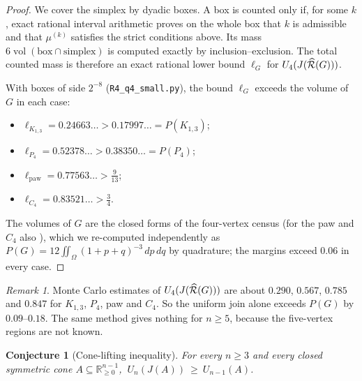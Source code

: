 \documentclass[11pt]{amsart}
\newtheorem{conjecture}[theorem]{Conjecture}
\theoremstyle{definition}
\theoremstyle{remark}
\newtheorem{remark}[theorem]{Remark}
\providecommand{\R}{\mathbb R}
\begin{document}
\begin{proof}
We cover the simplex by dyadic boxes.  A box is counted only if, for some
$k$, exact rational interval arithmetic proves on the whole box that $k$
is admissible and that $\mu^{(k)}$ satisfies the strict conditions above.
Its mass $6\operatorname{vol}(\text{box}\cap\text{simplex})$ is computed
exactly by inclusion--exclusion.  The total counted mass is therefore an
exact rational lower bound $\ell_G$ for $U_4(J(\widehat{\mathcal{R}}(G)))$.

With boxes of side $2^{-8}$ (\texttt{R4\_\allowbreak{}q4\_\allowbreak{}small.py}), the bound $\ell_G$
exceeds the volume of $G$ in each case:
\begin{itemize}
\item $\ell_{K_{1,3}}=0.24663\ldots>0.17997\ldots=P(K_{1,3})$;
\item $\ell_{P_4}=0.52378\ldots>0.38350\ldots=P(P_4)$;
\item $\ell_{\mathrm{paw}}=0.77563\ldots>\frac9{13}$;
\item $\ell_{C_4}=0.83521\ldots>\frac34$.
\end{itemize}
The volumes of $G$ are the closed forms of the four-vertex census
\cite{K-015} (for the paw and $C_4$ also \cite{R4-EJT}), which we
re-computed independently as $P(G)=12\iint_\Omega(1+p+q)^{-3}\,dp\,dq$ by
quadrature; the margins exceed $0.06$ in every case.
\end{proof}

\begin{remark}
Monte Carlo estimates of $U_4(J(\widehat{\mathcal{R}}(G)))$ are about $0.290$, $0.567$,
$0.785$ and $0.847$ for $K_{1,3}$, $P_4$, paw and $C_4$.  So the uniform
join alone exceeds $P(G)$ by $0.09$--$0.18$.  The same method gives
nothing for $n\ge5$, because the five-vertex regions are not known.
\end{remark}

\begin{conjecture}[Cone-lifting inequality]\label{R4:conj:cone}
For every $n\ge3$ and every closed symmetric cone
$A\subseteq\R^{n-1}_{\ge0}$, $\ U_n(J(A))\ \ge\ U_{n-1}(A)$.
\end{conjecture}
\end{document}
